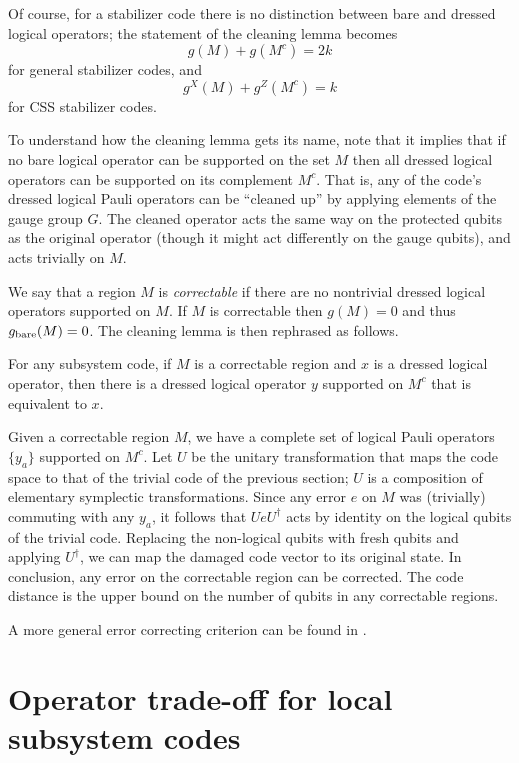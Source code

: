 Of course, for a stabilizer code there is no distinction 
between bare and dressed logical operators; 
the statement of the cleaning lemma becomes
\[
g(M) + g(M^c) = 2k
\]
for general stabilizer codes, and
\[
g^X(M) + g^Z(M^c) = k
\]
for CSS stabilizer codes.

To understand how the cleaning lemma gets its name, 
note that it implies that 
if no bare logical operator can be supported on the set $M$ 
then all dressed logical operators can be supported on its complement $M^c$. 
That is, any of the code's dressed logical Pauli operators can be ``cleaned up'' 
by applying elements of the gauge group $G$. 
The cleaned operator acts the same way on the protected qubits 
as the original operator (though it might act differently on the gauge qubits),
and acts trivially on $M$.

We say that a region $M$ is \emph{correctable} if there are no nontrivial dressed logical operators supported on $M$.
If $M$ is correctable 
then $g(M)=0$ and thus $g_{\rm bare}(M)=0$.
The cleaning lemma is then rephrased as follows.
\begin{lem}
\label{lem:clean-region}
For any subsystem code, if $M$ is a correctable region and $x$ is a dressed logical operator,
then there is a dressed logical operator $y$ supported on $M^c$ that is equivalent to $x$.
\end{lem}

\begin{rem}
Given a correctable region $M$, we have a complete set of logical Pauli operators $\{ y_a \}$ supported on $M^c$.
Let $U$ be the unitary transformation that maps the code space to that of the trivial code of the previous section;
$U$ is a composition of elementary symplectic transformations.
Since any error $e$ on $M$ was (trivially) commuting with any $y_a$,
it follows that $UeU^\dagger$ acts by identity on the logical qubits of the trivial code.
Replacing the non-logical qubits with fresh qubits and applying $U^\dagger$,
we can map the damaged code vector to its original state.
In conclusion, any error on the correctable region can be corrected.
The code distance is the upper bound on the number of qubits in any correctable regions.

A more general error correcting criterion
can be found in \cite[Chapter 15]{KitaevShenVyalyi2002CQC}.
\end{rem}

\section{Operator trade-off for local subsystem codes}
\label{sec:subsystem-tradeoff}

